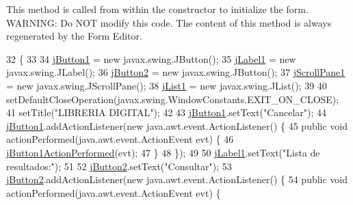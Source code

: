 This method is called from within the constructor to initialize the form. W\+A\+R\+N\+I\+NG\+: Do N\+OT modify this code. The content of this method is always regenerated by the Form Editor. 
\begin{DoxyCode}
32                                   \{
33 
34         \mbox{\hyperlink{class_interfaz_package_1_1_consulta_lista_a3634a8b3f65730375cb85b196872cb4f}{jButton1}} = \textcolor{keyword}{new} javax.swing.JButton();
35         \mbox{\hyperlink{class_interfaz_package_1_1_consulta_lista_a7cebe66cb1ff10204773f2c72f76b7f3}{jLabel1}} = \textcolor{keyword}{new} javax.swing.JLabel();
36         \mbox{\hyperlink{class_interfaz_package_1_1_consulta_lista_a4ce758269cf41492829b3602f2d0f5ab}{jButton2}} = \textcolor{keyword}{new} javax.swing.JButton();
37         \mbox{\hyperlink{class_interfaz_package_1_1_consulta_lista_a8b791a3cb8f0a4494b0e06d5b08fe9ad}{jScrollPane1}} = \textcolor{keyword}{new} javax.swing.JScrollPane();
38         \mbox{\hyperlink{class_interfaz_package_1_1_consulta_lista_af64dea173f739368a8fe9049edfdd9f0}{jList1}} = \textcolor{keyword}{new} javax.swing.JList();
39 
40         setDefaultCloseOperation(javax.swing.WindowConstants.EXIT\_ON\_CLOSE);
41         setTitle(\textcolor{stringliteral}{"LIBRERIA DIGITAL"});
42 
43         \mbox{\hyperlink{class_interfaz_package_1_1_consulta_lista_a3634a8b3f65730375cb85b196872cb4f}{jButton1}}.setText(\textcolor{stringliteral}{"Cancelar"});
44         \mbox{\hyperlink{class_interfaz_package_1_1_consulta_lista_a3634a8b3f65730375cb85b196872cb4f}{jButton1}}.addActionListener(\textcolor{keyword}{new} java.awt.event.ActionListener() \{
45             \textcolor{keyword}{public} \textcolor{keywordtype}{void} actionPerformed(java.awt.event.ActionEvent evt) \{
46                 \mbox{\hyperlink{class_interfaz_package_1_1_consulta_lista_a2924138ab98bafcc86ec498cfaf1d3c4}{jButton1ActionPerformed}}(evt);
47             \}
48         \});
49 
50         \mbox{\hyperlink{class_interfaz_package_1_1_consulta_lista_a7cebe66cb1ff10204773f2c72f76b7f3}{jLabel1}}.setText(\textcolor{stringliteral}{"Lista de resultados:"});
51 
52         \mbox{\hyperlink{class_interfaz_package_1_1_consulta_lista_a4ce758269cf41492829b3602f2d0f5ab}{jButton2}}.setText(\textcolor{stringliteral}{"Consultar"});
53         \mbox{\hyperlink{class_interfaz_package_1_1_consulta_lista_a4ce758269cf41492829b3602f2d0f5ab}{jButton2}}.addActionListener(\textcolor{keyword}{new} java.awt.event.ActionListener() \{
54             \textcolor{keyword}{public} \textcolor{keywordtype}{void} actionPerformed(java.awt.event.ActionEvent evt) \{

\end{DoxyCode}
